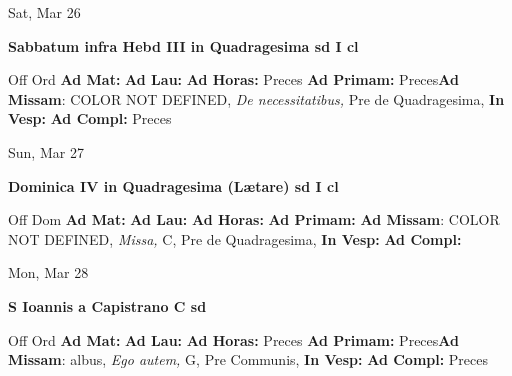 \documentclass[10pt]{book}
\begin{document}
\begin{center}
\begin{minipage}{3.5in}
\vspace{2em}
\begin{center}Sat, Mar 26
\end{center}
\textbf{ \large Sabbatum infra Hebd III in Quadragesima
\textnormal{\normalsize sd I cl}}

\begin{justify}Off Ord
\textbf{Ad Mat: }
\textbf{Ad Lau: }
\textbf{Ad Horas: }Preces
\textbf{Ad Primam: }Preces\textbf{Ad Missam}: COLOR NOT DEFINED, \textit{De necessitatibus,} Pre de Quadragesima, 
\textbf{In Vesp: }
\textbf{Ad Compl: }Preces
\end{justify}
\end{minipage}
\end{center}

\begin{center}
\begin{minipage}{3.5in}
\vspace{2em}
\begin{center}Sun, Mar 27
\end{center}
\textbf{ \large Dominica IV in Quadragesima (Lætare)
\textnormal{\normalsize sd I cl}}

\begin{justify}Off Dom
\textbf{Ad Mat: }
\textbf{Ad Lau: }
\textbf{Ad Horas: }
\textbf{Ad Primam: }\textbf{Ad Missam}: COLOR NOT DEFINED, \textit{Missa,} C, Pre de Quadragesima, 
\textbf{In Vesp: }
\textbf{Ad Compl: }
\end{justify}
\end{minipage}
\end{center}

\begin{center}
\begin{minipage}{3.5in}
\vspace{2em}
\begin{center}Mon, Mar 28
\end{center}
\textbf{ \large S Ioannis a Capistrano C
\textnormal{\normalsize sd}}

\begin{justify}Off Ord
\textbf{Ad Mat: }
\textbf{Ad Lau: }
\textbf{Ad Horas: }Preces
\textbf{Ad Primam: }Preces\textbf{Ad Missam}: albus, \textit{Ego autem,} G, Pre Communis, 
\textbf{In Vesp: }
\textbf{Ad Compl: }Preces
\end{justify}
\end{minipage}
\end{center}
\end{document}
